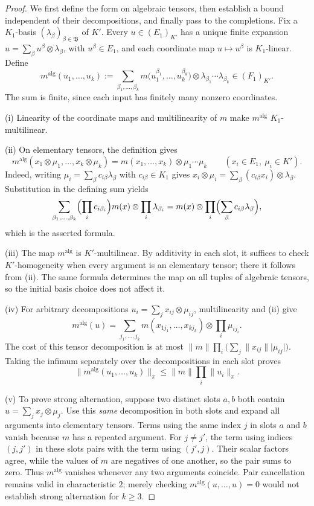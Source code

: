 \documentclass[11pt]{amsart}
\theoremstyle{definition}
\theoremstyle{remark}
\numberwithin{equation}{section}
\newcommand{\abs}[1]{\lvert #1\rvert}
\newcommand{\norm}[1]{\lVert #1\rVert}
\theoremstyle{plain}
\theoremstyle{definition}
\theoremstyle{plain}
\begin{document}
\begin{proof}
We first define the form on algebraic tensors, then establish a bound independent of their decompositions, and
finally pass to the completions. Fix a $K_1$\nobreakdash-basis $(\lambda_\beta)_{\beta\in\mathfrak B}$ of $K'$.
Every $u\in(E_1)_{K'}$ has a unique finite expansion
$u=\sum_\beta u^\beta\otimes\lambda_\beta$, with $u^\beta\in E_1$, and each coordinate map $u\mapsto u^\beta$ is
$K_1$\nobreakdash-linear. Define
\[
m^{\mathrm{alg}}(u_1,\dots,u_k):=
\sum_{\beta_1,\dots,\beta_k}
m\bigl(u_1^{\beta_1},\dots,u_k^{\beta_k}\bigr)\otimes
\lambda_{\beta_1}\cdots\lambda_{\beta_k}\in(F_1)_{K'}.
\]
The sum is finite, since each input has finitely many nonzero coordinates.

\textup{(i)} Linearity of the coordinate maps and multilinearity of $m$ make $m^{\mathrm{alg}}$
$K_1$\nobreakdash-multilinear.

\textup{(ii)} On elementary tensors, the definition gives
\[
m^{\mathrm{alg}}(x_1\otimes\mu_1,\dots,x_k\otimes\mu_k)
=m(x_1,\dots,x_k)\otimes\mu_1\cdots\mu_k
\qquad(x_i\in E_1,\ \mu_i\in K').
\]
Indeed, writing $\mu_i=\sum_\beta c_{i\beta}\lambda_\beta$ with $c_{i\beta}\in K_1$ gives
$x_i\otimes\mu_i=\sum_\beta(c_{i\beta}x_i)\otimes\lambda_\beta$. Substitution in the defining sum yields
\[
\sum_{\beta_1,\dots,\beta_k}
\Bigl(\prod_ic_{i\beta_i}\Bigr)m(x)\otimes\prod_i\lambda_{\beta_i}
=m(x)\otimes\prod_i\Bigl(\sum_\beta c_{i\beta}\lambda_\beta\Bigr),
\]
which is the asserted formula.

\textup{(iii)} The map $m^{\mathrm{alg}}$ is $K'$\nobreakdash-multilinear. By additivity in each slot, it suffices
to check $K'$\nobreakdash-homogeneity when every argument is an elementary tensor; there it follows from
\textup{(ii)}. The same formula determines the map on all tuples of algebraic tensors, so the initial basis
choice does not affect it.

\textup{(iv)} For arbitrary decompositions $u_i=\sum_jx_{ij}\otimes\mu_{ij}$, multilinearity and \textup{(ii)} give
\[
m^{\mathrm{alg}}(u)=
\sum_{j_1,\dots,j_k}m(x_{1j_1},\dots,x_{kj_k})\otimes\prod_i\mu_{ij_i}.
\]
The cost of this tensor decomposition is at most
$\norm m\prod_i\bigl(\sum_j\norm{x_{ij}}\abs{\mu_{ij}}\bigr)$.
Taking the infimum separately over the decompositions in each slot proves
\[
\norm{m^{\mathrm{alg}}(u_1,\dots,u_k)}_\pi\le\norm m\prod_i\norm{u_i}_\pi.
\]

\textup{(v)} To prove strong alternation, suppose two distinct slots $a,b$ both contain
$u=\sum_jx_j\otimes\mu_j$. Use this \emph{same} decomposition in both slots and expand all arguments into
elementary tensors. Terms using the same index $j$ in slots $a$ and $b$ vanish because $m$ has a repeated
argument. For $j\ne j'$, the term using indices $(j,j')$ in these slots pairs with the term using $(j',j)$.
Their scalar factors agree, while the values of $m$ are negatives of one another, so the pair sums to zero.
Thus $m^{\mathrm{alg}}$ vanishes whenever any two arguments coincide. Pair cancellation remains valid in
characteristic $2$; merely checking $m^{\mathrm{alg}}(u,\dots,u)=0$ would not establish strong alternation for
$k\ge3$.


\end{proof}
\end{document}
